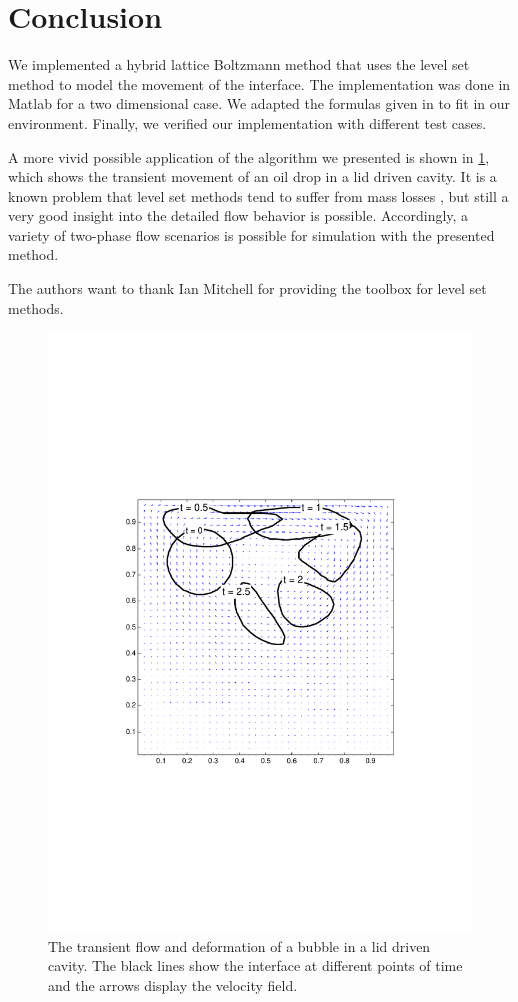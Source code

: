 \documentclass[final,leqno,onefignum,onetabnum]{siamltexmm}
\begin{document}
\section{Conclusion}
We implemented a hybrid lattice Boltzmann method that uses the level set method to model the movement of the interface. The implementation was done in Matlab for a two dimensional case. We adapted the formulas given in \cite{Thoemmes} to fit in our environment. Finally, we verified our implementation with different test cases.

A more vivid possible application of the algorithm we presented is shown in \cref{cavity}, which shows the transient movement of an oil drop in a lid driven cavity. It is a known problem that level set methods tend to suffer from mass losses \cite{Thoemmes}, but still a very good insight into the detailed flow behavior is possible. Accordingly, a variety of two-phase flow scenarios is possible for simulation with the presented method.

The authors want to thank Ian Mitchell for providing the toolbox for level set methods.
\begin{figure}
	\hfill\includegraphics[trim = 0mm 8cm 0mm 8.0cm, clip, width=.95\textwidth, natwidth=595,natheight=842]{cavity.pdf}\hspace*{\fill}
	\caption{The transient flow and deformation of a bubble in a lid driven cavity. The black lines show the interface at different points of time and the arrows display the velocity field.}
	\label{cavity}
\end{figure}
\end{document}
